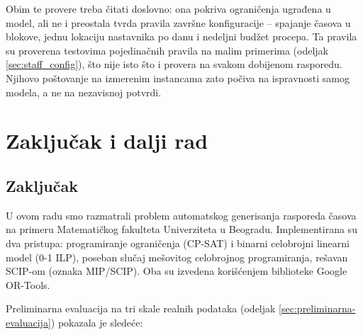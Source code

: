 \documentclass[12pt,oneside]{memoir}
\begin{document}
Obim te provere treba čitati doslovno: ona pokriva ograničenja ugrađena
u model, ali ne i preostala tvrda pravila završne konfiguracije --
spajanje časova u blokove, jednu lokaciju nastavnika po danu i nedeljni
budžet procepa. Ta pravila su proverena testovima pojedinačnih pravila
na malim primerima (odeljak \ref{sec:staff_config}), što nije isto što i
provera na svakom dobijenom rasporedu. Njihovo poštovanje na
izmerenim instancama zato počiva na ispravnosti samog modela, a ne na
nezavisnoj potvrdi.


\chapter{Zaključak i dalji rad}
\label{chp:zakljucak}

\section{Zaključak}

U ovom radu smo razmatrali problem automatskog generisanja rasporeda
časova na primeru Matematičkog fakulteta Univerziteta u Beogradu.
Implementirana su dva pristupa: programiranje ograničenja (CP-SAT) i
binarni celobrojni linearni model (0-1 ILP), poseban slučaj mešovitog
celobrojnog programiranja, rešavan SCIP-om (oznaka MIP/SCIP). Oba su
izvedena korišćenjem biblioteke Google OR-Tools.

Preliminarna evaluacija na tri skale realnih podataka (odeljak
\ref{sec:preliminarna-evaluacija}) pokazala je sledeće:
\end{document}
